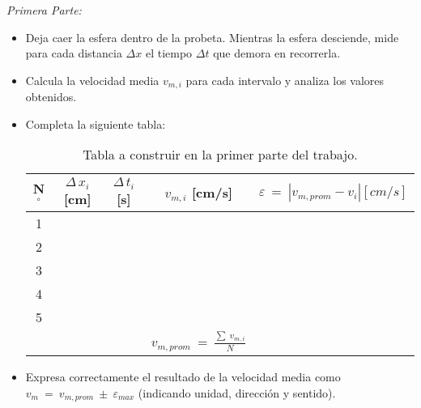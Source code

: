 \noindent
\textit{Primera Parte:}
\begin{itemize}
  \item Deja caer la esfera dentro de la probeta. Mientras la esfera desciende, mide para cada  distancia $\Delta x$ el tiempo $\Delta t$ que demora en recorrerla.
  
  \item Calcula la velocidad media  $v_{m,i}$ para cada intervalo y analiza los valores obtenidos.
  
  \item Completa la siguiente tabla:
  
  \begin{table}[!htb]
    \centering
    \label{tab:vm}
    \begin{tabular}{|c|c|c|c|c|}
    \hline
    N$^{\circ}$ & $\Delta\,x_i$ [cm] & $\Delta\,t_i$ [s] & $v_{m,i}$ [cm/s]                        & $\varepsilon \ = \ |v_{m,prom} - v_i|\si{[cm/s]}$ \\ \hline
    1           &                  &                 &                                         &                               \\ \hline
    2           &                  &                 &                                         &                               \\ \hline
    3           &                  &                 &                                         &                               \\ \hline
    4           &                  &                 &                                         &                               \\ \hline
    5           &                  &                 &                                         &                               \\ \hline
                &                  &                 & $v_{m,prom} \ = \ \frac{\sum \ v_{m,i}}{N}$ &                               \\ \hline
    \end{tabular}
    \caption{Tabla a construir en la primer parte del trabajo.}
  \end{table}
  \item Expresa correctamente el resultado de la velocidad media como $v_m \ = \ v_{m,prom} \ \pm \ \varepsilon_{max}$ (indicando unidad, dirección y sentido).
\end{itemize}

